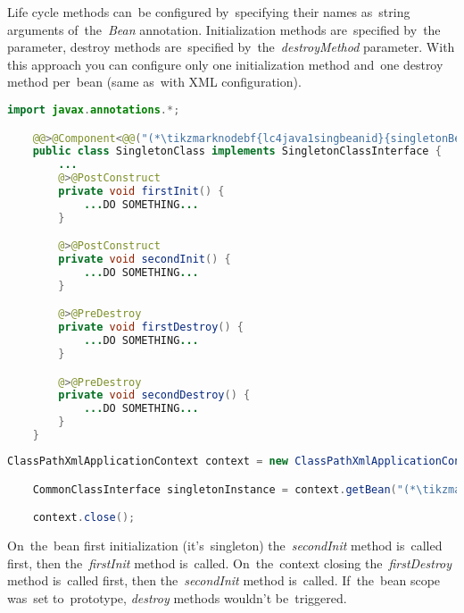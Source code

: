 Life cycle methods can~be configured by~specifying their names as~string arguments of~the~\textit{Bean} annotation. Initialization methods are~specified by~the~ parameter, destroy methods are~specified by~the~\textit{destroyMethod} parameter. With this approach you can configure only one initialization method and~one destroy method per~bean (same as~with XML configuration).
\newpage

\begin{lstlisting}[language=Java, title={Singleton bean class with multiple life cycle methods}]
    import javax.annotations.*;

    @@>@Component<@@("(*\tikzmarknodebf{lc4java1singbeanid}{singletonBeanId}[ForestGreen]*)")
    public class SingletonClass implements SingletonClassInterface {
        ...
        @>@PostConstruct
        private void firstInit() {
            ...DO SOMETHING...
        }

        @>@PostConstruct
        private void secondInit() {
            ...DO SOMETHING...
        }

        @>@PreDestroy
        private void firstDestroy() {
            ...DO SOMETHING...
        }

        @>@PreDestroy
        private void secondDestroy() {
            ...DO SOMETHING...
        }
    }
\end{lstlisting}
\begin{lstlisting}[language=Java, title={Usage}]
    ClassPathXmlApplicationContext context = new ClassPathXmlApplicationContext("configurationFile.xml");

    CommonClassInterface singletonInstance = context.getBean("(*\tikzmarknodebf{lc4java2singbeanid}{singletonBeanId}[ForestGreen]*)", SingletonClassInterface.class);

    context.close();
\end{lstlisting}

\noindent On~the~bean first initialization (it's~singleton) the~\textit{secondInit} method is~called first, then the~\textit{firstInit} method is~called. On~the~context closing the~\textit{firstDestroy} method is~called first, then the~\textit{secondInit} method is~called. If~the~bean scope was~set to~prototype, \textit{destroy} methods wouldn't be~triggered.
\newpage

